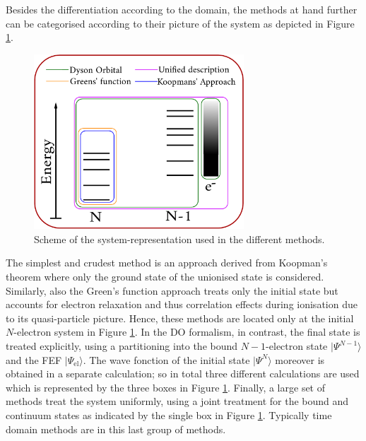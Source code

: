 Besides the differentiation according to the domain, the methods at hand further can be categorised according to their picture of the system as depicted in Figure \ref{fig:PEScat}.
\begin{figure}
   \includegraphics[width=0.7\textwidth]{Figures/Methods}
   \caption{Scheme of the system-representation used in the different methods.}
   \label{fig:PEScat}
\end{figure}
The simplest and crudest method is an approach derived from Koopman's theorem where only the ground state of the un\-ion\-ised state is considered.
Similarly, also the Green's function approach treats only the initial state but accounts for electron relaxation and thus correlation effects during ionisation due to its quasi-particle picture.
Hence, these methods are located only at the initial $N$-electron system in Figure \ref{fig:PEScat}.
In the DO formalism, in contrast, the final state is treated explicitly, using a partitioning into the bound $N-1$-electron state $|\Psi^{N-1}\rangle$ and the FEF $|\Psi_\text{el}\rangle$.
The wave fonction of the initial state $|\Psi^{N}\rangle$ moreover is obtained in a separate calculation; so in total three different calculations are used which is represented by the three boxes in Figure \ref{fig:PEScat}.
Finally, a large set of methods treat the system uniformly, using a joint treatment for the bound and continuum states as indicated by the single box in Figure \ref{fig:PEScat}.
Typically time domain methods are in this last group of methods.

